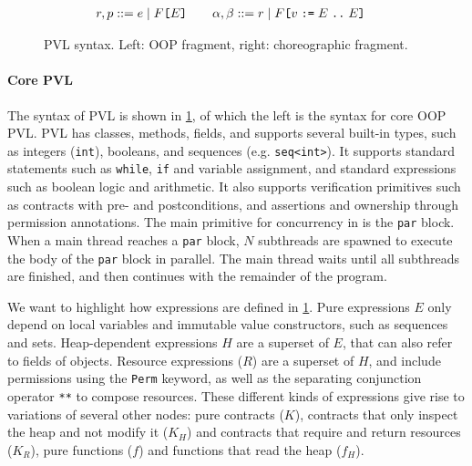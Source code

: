 \begin{figure}[t]
\begin{adjustwidth}{-0.15\paperwidth}{-0.15\paperwidth}
\begin{minipage}{0.5\textwidth}
\begin{align*}
r, p &::= e \mid F\texttt{[}E\texttt{]} \qquad \alpha, \beta ::= r \mid F\texttt{[}v \; \texttt{:=} \; E \; \texttt{..} \; E\texttt{]}
\end{align*}
\begin{comment}
- $F$ is not included in $r$ because we use $r$ mostly in transformation rules. Referring to individual families only happens in actual programs, so we just add it on its own to $E$
- \chor is included in $R_{chor}$ so you can use it in contracts, and not in branch/loop conditions.
\end{comment}
\end{minipage}%
\end{adjustwidth}
\caption{PVL syntax. Left: OOP fragment, right: choreographic fragment.}\label{app:fig:syntax}
\end{figure}

\paragraph{Core PVL} The syntax of PVL is shown in \cref{app:fig:syntax}, of which the left is the syntax for core OOP PVL. PVL has classes, methods, fields, and supports several built-in types, such as integers (\texttt{int}), booleans, and sequences (e.g. \texttt{seq<int>}). It supports standard statements such as \texttt{while}, \texttt{if} and variable assignment, and standard expressions such as boolean logic and arithmetic. It also supports verification primitives such as contracts with pre- and postconditions, and assertions and ownership through permission annotations. The main primitive for concurrency in \pvl{} is the \texttt{par} block. When a main thread reaches a \texttt{par} block, $N$ subthreads are spawned to execute the body of the \texttt{par} block in parallel. The main thread waits until all subthreads are finished, and then continues with the remainder of the program.

We want to highlight how expressions are defined in \cref{app:fig:syntax}. Pure expressions $E$ only depend on local variables and immutable value constructors, such as sequences and sets. Heap-dependent expressions $H$ are a superset of $E$, that can also refer to fields of objects. Resource expressions ($R$) are a superset of $H$, and include permissions using the \texttt{Perm} keyword, as well as the separating conjunction operator \texttt{**} to compose resources. These different kinds of expressions give rise to variations of several other nodes: pure contracts ($K$), contracts that only inspect the heap and not modify it ($K_H$) and contracts that require and return resources ($K_R$), pure functions ($f$) and functions that read the heap ($f_H$). 

